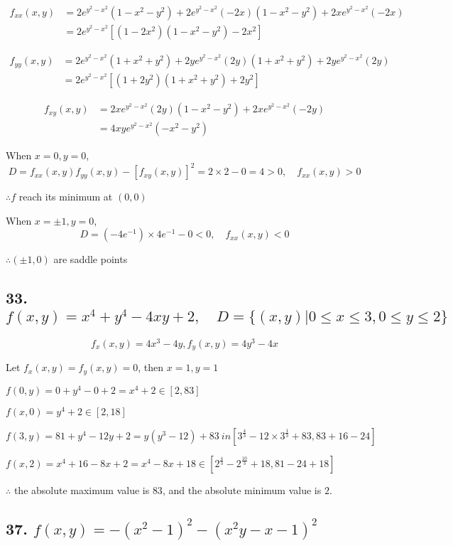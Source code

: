 \documentclass{article}
\begin{document}
  $$\begin{aligned}
    f_{xx}(x, y) &= 2e^{y^2-x^2}(1-x^2-y^2) + 2e^{y^2-x^2}(-2x)(1-x^2-y^2) + 2xe^{y^2-x^2}(-2x) \\ 
    &= 2e^{y^2-x^2}[(1-2x^2)(1-x^2-y^2) - 2x^2]
  \end{aligned}$$

  $$\begin{aligned}
    f_{yy}(x, y) &= 2e^{y^2-x^2}(1+x^2+y^2) + 2ye^{y^2-x^2}(2y)(1+x^2+y^2) + 2ye^{y^2-x^2}(2y) \\ 
    &= 2e^{y^2-x^2}[(1+2y^2)(1+x^2+y^2) + 2y^2]
  \end{aligned}$$

  $$\begin{aligned}
    f_{xy}(x, y) &= 2xe^{y^2-x^2}(2y)(1-x^2-y^2) + 2xe^{y^2-x^2}(-2y) \\ 
    &= 4xye^{y^2-x^2}(-x^2-y^2)
  \end{aligned}$$

  When $x = 0, y = 0$, $$D = f_{xx}(x, y)f_{yy}(x, y) - [f_{xy}(x, y)]^2 = 2 \times 2 - 0 = 4 > 0, \quad f_{xx}(x, y) > 0$$

  $\therefore f$ reach its minimum at $(0, 0)$

  When $x = \pm 1, y = 0$, $$D = (-4e^{-1}) \times 4e^{-1} - 0 < 0, \quad f_{xx}(x, y) < 0$$

  $\therefore (\pm 1, 0)$ are saddle points

  \subsection*{33. $f(x, y) = x^4+y^4-4xy+2, \quad D = \{ (x, y) | 0 \leq x \leq 3, 0 \leq y \leq 2 \}$}

  $$f_x(x, y) = 4x^3-4y, f_y(x, y) = 4y^3 - 4x$$

  Let $f_x(x, y) = f_y(x, y) = 0$, then $x = 1, y = 1$

  $f(0, y) = 0 + y^4 - 0 + 2 = x^4 + 2 \in [2, 83]$

  $f(x, 0) = y^4+2 \in [2, 18]$

  $f(3, y) = 81 + y^4 - 12y + 2 = y(y^3-12) + 83 \ in [3^{\frac 4 3} - 12 \times 3^{\frac 1 3} + 83, 83 + 16 - 24]$

  $f(x, 2) = x^4+16-8x+2 = x^4 - 8x + 18 \in [2^{\frac 4 3} - 2^{\frac{10}{3}} + 18, 81-24+18]$

  $\therefore $ the absolute maximum value is $83$, and the absolute minimum value is $2$.
  
  \subsection*{37. $f(x, y) = -(x^2-1)^2 - (x^2y -x-1)^2$}
\end{document}
